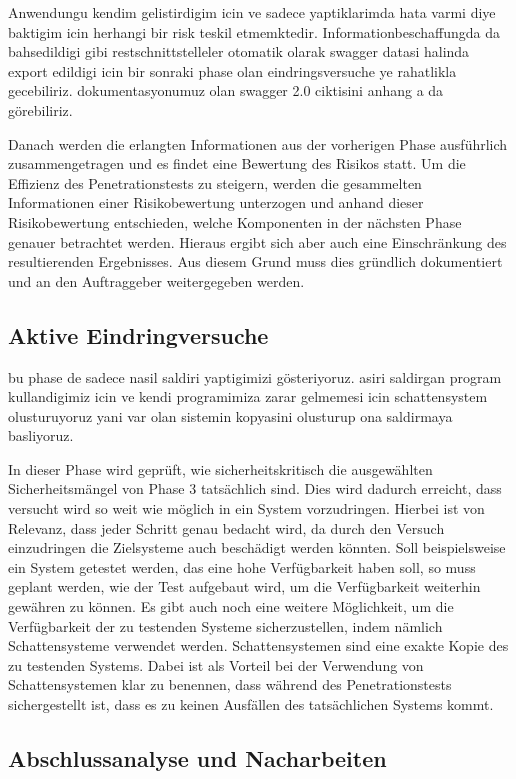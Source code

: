 Anwendungu kendim gelistirdigim icin ve sadece yaptiklarimda hata varmi diye baktigim icin herhangi bir risk teskil etmemktedir. Informationbeschaffungda da bahsedildigi gibi restschnittstelleler otomatik olarak swagger datasi halinda export edildigi icin bir sonraki phase olan eindringsversuche ye rahatlikla gecebiliriz. dokumentasyonumuz olan swagger 2.0 ciktisini anhang a da görebiliriz.

Danach werden die erlangten Informationen aus der vorherigen Phase ausführlich zusammengetragen und es findet eine Bewertung des Risikos statt. Um die Effizienz des Penetrationstests zu steigern, werden die gesammelten Informationen einer Risikobewertung unterzogen und anhand dieser Risikobewertung entschieden, welche Komponenten in der nächsten Phase genauer betrachtet werden. Hieraus ergibt sich aber auch eine Einschränkung des resultierenden Ergebnisses. Aus diesem Grund muss dies gründlich dokumentiert und an den Auftraggeber weitergegeben werden.

\subsection{Aktive Eindringversuche}

bu phase de sadece nasil saldiri yaptigimizi gösteriyoruz. asiri saldirgan program kullandigimiz icin ve kendi programimiza zarar gelmemesi icin schattensystem olusturuyoruz yani var olan sistemin kopyasini olusturup ona saldirmaya basliyoruz.

In dieser Phase wird geprüft, wie sicherheitskritisch die ausgewählten Sicherheitsmängel von Phase 3 tatsächlich sind. Dies wird dadurch erreicht, dass versucht wird so weit wie möglich in ein System vorzudringen. Hierbei ist von Relevanz, dass jeder Schritt genau bedacht wird, da durch den Versuch einzudringen die Zielsysteme auch beschädigt werden könnten. Soll beispielsweise ein System getestet werden, das eine hohe Verfügbarkeit haben soll, so muss geplant werden, wie der Test aufgebaut wird, um die Verfügbarkeit weiterhin gewähren zu können. Es gibt auch noch eine weitere Möglichkeit, um die Verfügbarkeit der zu testenden Systeme sicherzustellen, indem nämlich Schattensysteme verwendet werden. Schattensystemen sind eine exakte Kopie des zu testenden Systems. Dabei ist als Vorteil bei der Verwendung von Schattensystemen klar zu benennen, dass während des Penetrationstests sichergestellt ist, dass es zu keinen Ausfällen des tatsächlichen Systems kommt.

\subsection{Abschlussanalyse und Nacharbeiten}

